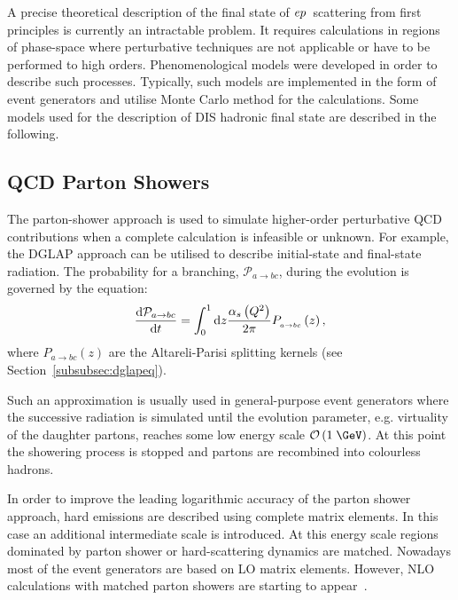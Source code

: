 A precise theoretical description of the final state of $\mbox{$e p$}$~scattering from first principles is currently an intractable problem. It requires calculations in regions of phase-space where perturbative techniques are not applicable or have to be performed to high orders. Phenomenological models were developed in order to describe such processes. Typically, such models are implemented in the form of event generators and utilise Monte Carlo method for the calculations. Some models used for the description of DIS hadronic final state are described in the following.
\subsection{QCD Parton Showers}
\label{sec:qcdpartonshower}
The parton-shower approach is used to simulate higher-order perturbative QCD contributions when a complete calculation is infeasible or unknown. For example, the DGLAP approach can be utilised to describe initial-state and final-state radiation. The probability for a branching, $\mathcal{P}_{a\rightarrow bc}$, during the evolution is governed by the equation:
\begin{equation}
\frac{\mathrm{d}\mathcal{P}_{a\rightarrow bc}}{\mathrm{d}t} = \int_0^1{\mathrm{d}z\frac{\mbox{$\alpha_{s}$}\left(\mbox{${Q^2}$}\right)}{2\pi}P_{_{a\rightarrow bc}}}\left(z\right),
\end{equation}
where $P_{a\rightarrow bc}\left(z\right)$ are the Altareli-Parisi splitting kernels (see Section~\ref{subsubsec:dglapeq}).

Such an approximation is usually used in general-purpose event generators where the successive radiation is simulated until the evolution parameter, e.g. virtuality of the daughter partons, reaches some low energy scale $\mathcal{O}\left(1\;\GeV\right)$. At this point the showering process is stopped and partons are recombined into colourless hadrons.

In order to improve the leading logarithmic accuracy of the parton shower approach, hard emissions are described using complete matrix elements. In this case an additional intermediate scale is introduced. At this energy scale regions dominated by parton shower or hard-scattering dynamics are matched. Nowadays most of the event generators are based on LO matrix elements. However, NLO calculations with matched parton showers are starting to appear~\cite{Frixione:2007vw,Frixione:2002ik}.

